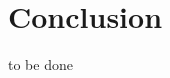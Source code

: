\section{Conclusion}
\label{sec.conclsion}

to be done

\begin{comment}
SAFENESS
in ceu the programmer cannot write synchronous bad code as it cannot write a 
loop w/o an await
hence the code must be async and will run with low priority

We presented \CEU{}, a language that aims to unify the apparently antagonistic 
imperative and declarative reactive programming models.
\CEU{} is based on a small synchronous kernel similar to Esterel that provides 
reaction to events and imperative constructs such as sequences, parallel 
blocks, and assignments.

In order to support FRP in \CEU{}, we added \emph{internal events} as a 
communication mechanism among \CEU's trails.
Internal events follow a stack execution policy, forcing that a sequence of 
triggers reacts backwards.
This semantics is required to respect an arbitrary level of dependency among 
behaviors, and also avoids cyclic dependencies for mutually dependent 
behaviors.

The coexistence of concurrency (through parallel blocks) and global assignments 
requires a rigorous temporal analysis in programs to detect any possible kind 
of non-determinism.
\CEU{} transforms programs into deterministic finite automatons to detect the 
three kinds of non-determinism that can arise in programs: concurrent access to 
variables, par/or terminations and loop escapes.

Besides supporting both imperative and declarative reactive programming models, 
\CEU{} also brings novel features to the scene: native support for 
\emph{physical time} and simulation from within the own programs.

phys time also SAFE+express

We believe that the recurrent use of physical time in reactive applications 
already justifies providing a convenient syntax for timing purposes.
Furthermore, native support is also \emph{desired} to avoid dealing explicitly 
with \emph{residual delta times} from expired timers; and is \emph{required} to 
allow extending \CEU's temporal analysis to include physical time.

By allowing asynchronous blocks to enqueue inputs to the synchronous side, it
is easy to simulate and test the execution of \CEU{} programs with total 
control and accuracy with regard to the order of input events and passage of 
time: all is done with the same language and inside the own programs.


\end{comment}
